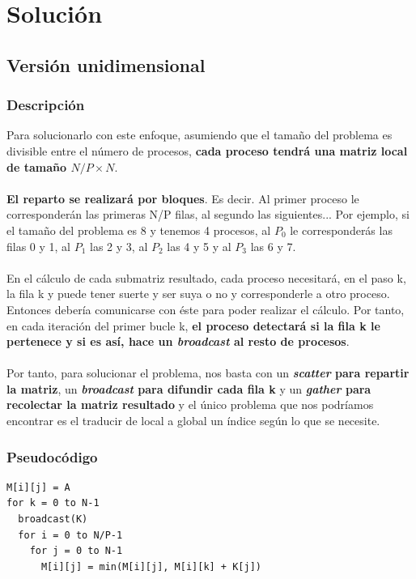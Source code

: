 \section{Solución}

\subsection{Versión unidimensional}

\subsubsection{Descripción}

Para solucionarlo con este enfoque, asumiendo que el tamaño del problema es divisible entre el número de procesos, \textbf{cada proceso tendrá una matriz local de tamaño $N/P \times N$}.
\\ \\
\textbf{El reparto se realizará por bloques}. Es decir. Al primer proceso le corresponderán las primeras N/P filas, al segundo las siguientes... Por ejemplo, si el tamaño del problema es 8 y tenemos 4 procesos, al $P_{0}$ le corresponderás las filas 0 y 1, al $P_{1}$ las 2 y 3, al $P_{2}$ las 4 y 5 y al $P_{3}$ las 6 y 7.
\\ \\
En el cálculo de cada submatriz resultado, cada proceso necesitará, en el paso k, la fila k y puede tener suerte y ser suya o no y corresponderle a otro proceso. Entonces debería comunicarse con éste para poder realizar el cálculo. Por tanto, en cada iteración del primer bucle k, \textbf{el proceso detectará si la fila k le pertenece y si es así, hace un \textit{broadcast} al resto de procesos}.
\\ \\
Por tanto, para solucionar el problema, nos basta con un \textbf{\textit{scatter} para repartir la matriz}, un \textbf{\textit{broadcast} para difundir cada fila k} y un \textbf{\textit{gather} para recolectar la matriz resultado} y el único problema que nos podríamos encontrar es el traducir de local a global un índice según lo que se necesite.

\subsubsection{Pseudocódigo}

\begin{lstlisting}[style=c]
M[i][j] = A
for k = 0 to N-1
  broadcast(K)
  for i = 0 to N/P-1
    for j = 0 to N-1
      M[i][j] = min(M[i][j], M[i][k] + K[j])
\end{lstlisting}

